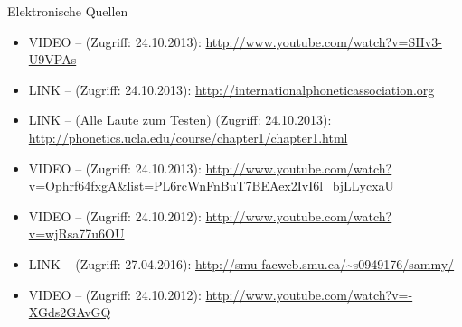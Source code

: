\begin{frame}{Elektronische Quellen}
	\small
	
	\begin{itemize}
		\item VIDEO --  (Zugriff: 24.10.2013): \url{http://www.youtube.com/watch?v=SHv3-U9VPAs}
		\item LINK --  (Zugriff: 24.10.2013): \url{http://internationalphoneticassociation.org}
		\item LINK --  (Alle Laute zum Testen) (Zugriff: 24.10.2013):\\ \url{http://phonetics.ucla.edu/course/chapter1/chapter1.html}
		\item VIDEO --  (Zugriff: 24.10.2013): \url{http://www.youtube.com/watch?v=Ophrf64fxgA&list=PL6rcWnFnBuT7BEAex2IvI6l_bjLLycxaU}
		\item VIDEO --  (Zugriff: 24.10.2012): \url{http://www.youtube.com/watch?v=wjRsa77u6OU}
		\item LINK --  (Zugriff: 27.04.2016): \url{http://smu-facweb.smu.ca/~s0949176/sammy/}
		\item VIDEO --  (Zugriff: 24.10.2012): \url{http://www.youtube.com/watch?v=-XGds2GAvGQ}
	\end{itemize}
	
\end{frame}


